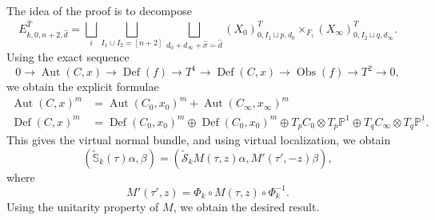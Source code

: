 \documentclass[leqno, openany]{memoir}
\theoremstyle{definition}
\theoremstyle{remark}
\theoremstyle{plain}
\theoremstyle{definition}
\theoremstyle{remark}
\newcommand{\bS}{\mathbb{S}}
\renewcommand{\P}{\mathbb{P}}
\newcommand{\mc}[1]{\mathcal{#1}}
\newcommand{\on}[1]{\operatorname{#1}}
\newcommand{\wt}[1]{\widetilde{#1}}
\newcommand{\wh}[1]{\widehat{#1}}
\DeclareMathOperator{\Aut}{Aut}
\begin{document}
The idea of the proof is to decompose
\[ E_{k,0,n+2,\wh{d}}^{\wh{T}} = \bigsqcup_i \bigsqcup_{I_1 \cup I_2 = [n+2]} \bigsqcup_{d_0 + d_{\infty} + \wh{\sigma} = \wh{{d}}} (X_0)_{0,I_1 \sqcup p, d_0}^T \times_{F_i} (X_{\infty})_{0,I_2 \sqcup q, d_{\infty}}^T. \]
Using the exact sequence
\[ 0 \to \Aut(C,x) \to \on{Def}(f) \to T^1 \to \on{Def}(C,x) \to \on{Obs}(f) \to T^2 \to 0, \]
we obtain the explicit formulae
\begin{align*}
    \Aut(C,x)^m &= \Aut(C_0,x_0)^m + \Aut(C_{\infty}, x_{\infty})^m \\
    \on{Def}(C,x)^m &= \on{Def}(C_0, x_0)^m \oplus \on{Def}(C_0, x_0)^m \oplus T_p C_0 \otimes T_p \P^1 \oplus T_q C_{\infty} \otimes T_q \P^1.
\end{align*}
This gives the virtual normal bundle, and using virtual localization, we obtain
\[ (\wt{\bS}_k(\tau) \alpha, \beta) = (\wt{\mc{S}}_k M(\tau, z) \alpha, M'(\tau', -z) \beta), \]
where
\[ M'(\tau', z) = \Phi_k \circ M(\tau, z) \circ \Phi_k^{-1}. \]
Using the unitarity property of $M$, we obtain the desired result.
\end{document}
